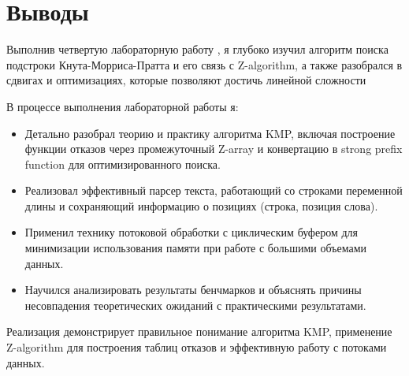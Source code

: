 \section{Выводы}

Выполнив четвертую лабораторную работу , я глубоко изучил алгоритм поиска подстроки Кнута-Морриса-Пратта и его связь с Z-algorithm, а также разобрался в сдвигах и оптимизациях, которые позволяют достичь линейной сложности

В процессе выполнения лабораторной работы я:

\begin{itemize}
    \item Детально разобрал теорию и практику алгоритма KMP, включая построение функции отказов через промежуточный Z-array и конвертацию в strong prefix function для оптимизированного поиска.

    \item Реализовал эффективный парсер текста, работающий со строками переменной длины и сохраняющий информацию о позициях (строка, позиция слова).

    \item Применил технику потоковой обработки с циклическим буфером для минимизации использования памяти при работе с большими объемами данных.

    \item Научился анализировать результаты бенчмарков и объяснять причины несовпадения теоретических ожиданий с практическими результатами.
\end{itemize}

Реализация демонстрирует правильное понимание алгоритма KMP, применение Z-algorithm для построения таблиц отказов и эффективную работу с потоками данных.

\pagebreak

